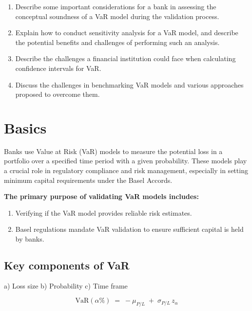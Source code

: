 
\begin{mrkeybox}[title={Learning objectives in this reading}]
\small
\begin{enumerate}[label=\textbf{\alph*.},leftmargin=1.7em]
\item Describe some important considerations for a bank in assessing the conceptual soundness of
      a VaR model during the validation process.
\item Explain how to conduct sensitivity analysis for a VaR model, and describe the potential
      benefits and challenges of performing such an analysis.
\item Describe the challenges a financial institution could face when calculating confidence
      intervals for VaR.
\item Discuss the challenges in benchmarking VaR models and various approaches proposed to
      overcome them.
\end{enumerate}
\end{mrkeybox}

\section{Basics}

Banks use Value at Risk (VaR) models to measure the potential loss in a portfolio over a
specified time period with a given probability. These models play a crucial role in regulatory
compliance and risk management, especially in setting minimum capital requirements under the
Basel Accords.

\textbf{The primary purpose of validating VaR models includes:}
\begin{enumerate}
\item Verifying if the VaR model provides reliable risk estimates.
\item Basel regulations mandate VaR validation to ensure sufficient capital is held by banks.
\end{enumerate}

\subsection{Key components of VaR}
a) Loss size \quad b) Probability \quad c) Time frame

\begin{mrfmlbox}
\[ \mathrm{VaR}(\alpha\%) \;=\; -\mu_{P/L} \;+\; \sigma_{P/L}\, z_\alpha \]
\end{mrfmlbox}

